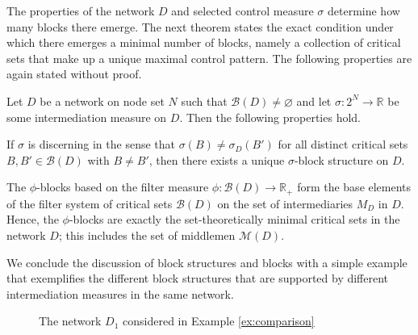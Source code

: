 The properties of the network $D$ and selected control measure $\sigma$ determine how many blocks there emerge. The next theorem states the exact condition under which there emerges a minimal number of blocks, namely a collection of critical sets that make up a unique maximal control pattern. The following properties are again stated without proof.
\begin{property}
Let $D$ be a network on node set $N$ such that $\mathcal{B} (D) \neq \varnothing$ and let $\sigma \colon 2^N \to \mathbb{R}$ be some intermediation measure on $D$. Then the following properties hold.
\begin{numm}
\item If $\sigma$ is discerning in the sense that $\sigma (B) \neq \sigma_D (B')$ for all distinct critical sets $B,B' \in \mathcal{B} (D)$ with $B \neq B'$, then there exists a unique $\sigma$-block structure on $D$.

\item The $\phi$-blocks based on the filter measure $\phi \colon \mathcal{B} (D) \to \mathbb{R}_+$ form the base elements of the filter system of critical sets $\mathcal{B} (D)$ on the set of intermediaries $M_D$ in $D$. Hence, the $\phi$-blocks are exactly the set-theoretically minimal critical sets in the network $D$; this includes the set of middlemen $\mathcal{M} (D)$.
\end{numm}
\end{property}
We conclude the discussion of block structures and blocks with a simple example that exemplifies the different block structures that are supported by different intermediation measures in the same network.

\begin{figure}[h]
\begin{center}
\end{center}
\caption{The network $D_1$ considered in Example \ref{ex:comparison}}
\label{Fig2}
\end{figure}


